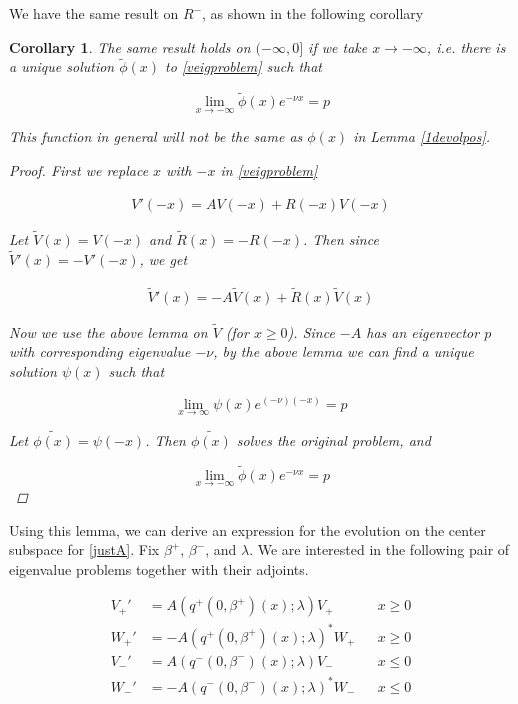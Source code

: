 \documentclass[12pt]{article}
\newtheorem{corollary}{Corollary}
\begin{document}
We have the same result on $R^-$, as shown in the following corollary


\begin{corollary}\label{1devolneg}
The same result holds on $(-\infty, 0]$ if we take $x \rightarrow -\infty$, i.e. there is a unique solution $\tilde{\phi}(x)$ to \eqref{veigproblem} such that 

\[
\lim_{x\rightarrow -\infty} \tilde{\phi}(x) e^{-\nu x} = p
\]

This function in general will not be the same as $\phi(x)$ in Lemma \ref{1devolpos}.

\begin{proof}
First we replace $x$ with $-x$ in \eqref{veigproblem}

\begin{align*}
V'(-x) = A V(-x) + R(-x)V(-x)
\end{align*}

Let $\tilde{V}(x) = V(-x)$ and $\tilde{R}(x) = -R(-x)$. Then since $\tilde{V}'(x) = -V'(-x)$, we get

\begin{align*}
\tilde{V}'(x) = -A \tilde{V}(x) + \tilde{R}(x)\tilde{V}(x)
\end{align*}

Now we use the above lemma on $\tilde{V}$ (for $x \geq 0$). Since $-A$ has an eigenvector $p$ with corresponding eigenvalue $-\nu$, by the above lemma we can find a unique solution $\psi(x)$ such that 

\[
\lim_{x\rightarrow \infty} \psi(x) e^{(-\nu)(-x)} = p
\]

Let $\tilde{\phi(x)} = \psi(-x)$. Then $\tilde{\phi(x)}$ solves the original problem, and

\[
\lim_{x\rightarrow -\infty} \tilde{\phi}(x) e^{-\nu x } = p
\]

\end{proof}
\end{corollary}

Using this lemma, we can derive an expression for the evolution on the center subspace for \eqref{justA}. Fix $\beta^+$, $\beta^-$, and $\lambda$. We are interested in the following pair of eigenvalue problems together with their adjoints.

\begin{align}
V_+' &= A(q^+(0, \beta^+)(x); \lambda) V_+ && x \geq 0 \label{eig:V+} \\
W_+' &= -A(q^+(0, \beta^+)(x); \lambda)^* W_+ && x \geq 0\label{eig:W+} \\
V_-' &= A(q^-(0, \beta^-)(x); \lambda) V_- && x \leq 0 \label{eig:V-} \\
W_-' &= -A(q^-(0, \beta^-)(x); \lambda)^* W_- && x \leq 0 \label{eig:W-}
\end{align}
\end{document}

